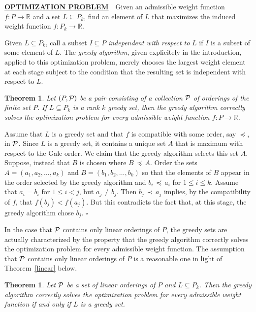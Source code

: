 \documentclass[12pt]{article}
\newcommand{\R}{{\mathbb R}}
\newcommand{\p}{{\preceq}}
\renewcommand{\P}{{\cal P}}
\newcommand{\proof}{\noindent{\em Proof: }}
\newcommand{\B}{\bigskip}
\newcommand{\qed}{\hspace{\fill}$\square$}
\newtheorem{theorem}[equation]{Theorem}
\begin{document}
\underline{{\bf OPTIMIZATION PROBLEM}} \,\, Given an admissible weight
function $f: P \rightarrow \R$ and a set $L \subseteq P_k$, find an
element of $L$ that maximizes the induced weight function $f : P_k
\rightarrow \R$. \B

Given $L \subseteq P_k$, call a subset $I\subseteq P$ {\it independent
with respect to} $L$ if $I$ is a subset of some element of $L$.  The
{\it greedy algorithm}, given explicitely in the introduction,
applied to this optimization problem, merely chooses the largest weight
element at each stage subject to the condition that the resulting set
is independent with respect to $L$.

\begin{theorem} \label{algtheorem1} Let $(P, \P)$ be a pair consisting
of a collection $\P$ of orderings of the finite set $P$.  If $L
\subseteq P_k$ is a rank $k$ greedy set, then the greedy algorithm
correctly solves the optimization problem for every admissible weight
function $f: P \rightarrow \R$.
\end{theorem}

\proof Assume that $L$ is a greedy set and that $f$ is compatible with
some order, say $\p$, in $\P$.  Since $L$ is a greedy set, it contains
a unique set $A$ that is maximum with respect to the Gale order.  We
claim that the greedy algorithm selects this set $A$.  Suppose,
instead that $B$ is chosen where $B \, \p \, A$.  Order the sets $A =
( a_1, a_2, \dots, a_k )$ and $B = ( b_1, b_2, \dots, b_k )$ so that
the elements of $B$ appear in the order selected by the greedy
algorithm and $b_i \, \p \, a_i$ for $1\leq i \leq k$.  Assume that
$a_i = b_i$ for $1\leq i < j$, but $a_j \neq b_j$.  Then $b_j \,\prec \,
a_j$ implies, by the compatibility of $f$, that $f(b_j) < f(a_j)$.  But
this contradicts the fact that, at this stage, the greedy
algorithm chose $b_j$.  \qed \B

In the case that $\P$ contains only linear orderings of $P$, the
greedy sets are actually characterized by the property that the greedy
algorithm correctly solves the optimization problem for every
admissible weight function.  The assumption that $\P$ contains only
linear orderings of $P$ is a reasonable one in light of
Theorem~\ref{linear} below.

\begin{theorem} \label{algtheorem2} Let $\P$ be a set of linear orderings
of $P$ and $L \subseteq P_k$.  Then the greedy algorithm correctly
solves the optimization problem for every admissible weight function
if and only if $L$ is a greedy set.
\end{theorem}
\end{document}
